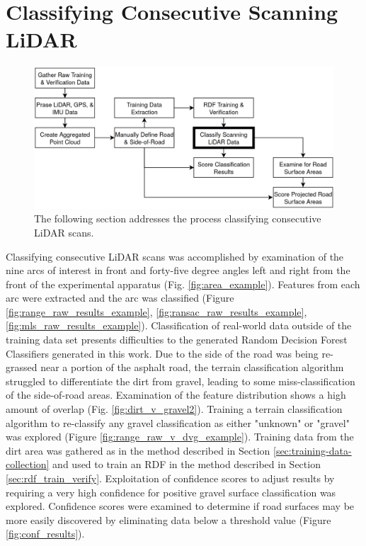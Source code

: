 \documentclass[numbered,pdftex]{ohio-etd}
\begin{document}
{{	} %
		
	\section{Classifying Consecutive Scanning LiDAR}\label{sec:classify_consec_scan_lidar}{
		
		\begin{figure}[H]
			\centering
			\includegraphics[width=0.95\linewidth]{Defense_Images/test_2.png}
			\caption[Classifying Consecutive LiDAR Scans Flowchart Context]{The following section addresses the process classifying consecutive LiDAR scans.}
			\label{fig:test_2.png}
		\end{figure}
			
		{
			
			Classifying consecutive LiDAR scans was accomplished by examination of the nine arcs of interest in front and forty-five degree angles left and right from the front of the experimental apparatus (Fig. \ref{fig:area_example}). Features from each arc were extracted and the arc was classified (Figure \ref{fig:range_raw_results_example}, \ref{fig:ransac_raw_results_example}, \ref{fig:mls_raw_results_example}). Classification of real-world data outside of the training data set presents difficulties to the generated Random Decision Forest Classifiers generated in this work. Due to the side of the road was being re-grassed near a portion of the asphalt road, the terrain classification algorithm struggled to differentiate the dirt from gravel, leading to some miss-classification of the side-of-road areas. Examination of the feature distribution shows a high amount of overlap (Fig. \ref{fig:dirt_v_gravel2}). Training a terrain classification algorithm to re-classify any gravel classification as either "unknown" or "gravel" was explored (Figure \ref{fig:range_raw_v_dvg_example}). Training data from the dirt area was gathered as in the method described in Section \ref{sec:training-data-collection} and used to train an RDF in the method described in Section \ref{sec:rdf_train_verify}. Exploitation of confidence scores to adjust results by requiring a very high confidence for positive gravel surface classification was explored. Confidence scores were examined to determine if road surfaces may be more easily discovered by eliminating data below a threshold value (Figure \ref{fig:conf_results}). }
		
}}
\end{document}
